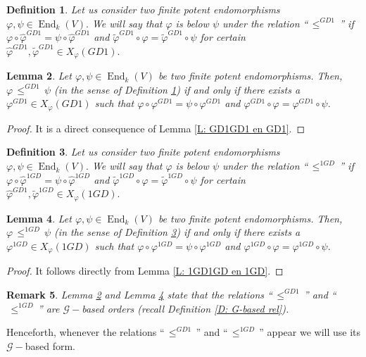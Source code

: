 \documentclass[10pt,a4paper]{amsart}
\newtheorem{defn}{Definition}
\newtheorem{lem}[defn]{Lemma}
\theoremstyle{plain}
\newtheorem{rem}[defn]{Remark}
\theoremstyle{remark}
\numberwithin{equation}{section} \numberwithin{defn}{section}
\newcommand\ed{\operatorname{End}}
\newcommand{\f}{\varphi}
\newcommand{\g}{\psi}
\begin{document}
\begin{defn}\label{D: Def GD1 order}
Let us consider two finite potent endomorphisms $\f, \g \in \ed_k(V).$ We will say that $\f$ is below $\g$ under the relation ``$\, \leq^{GD1} \,$'' if $\f \circ \hat{\f}^{GD1}=\g \circ \hat{\f}^{GD1}$ and $\tilde{\f}^{GD1}\circ \f=\tilde{\f}^{GD1}\circ \g$ for certain $\hat{\f}^{GD1},\tilde{\f}^{GD1}\in X_{\f}(GD1).$ 
\end{defn}

\begin{lem}\label{L: GD1 is G-Based}
Let $\f,\g \in \ed_k(V)$ be two finite potent endomorphisms. Then, $\f \, \leq^{GD1} \, \g$ (in the sense of Definition \ref{D: Def GD1 order}) if and only if there exists a $\f^{GD1}\in X_{\f}(GD1)$ such that $\f\circ \f^{GD1}=\g\circ \f^{GD1}$ and $\f^{GD1}\circ \f=\f^{GD1}\circ \g .$
\end{lem}
\begin{proof}
It is a direct consequence of Lemma \ref{L: GD1GD1 en GD1}.
\end{proof}


\begin{defn}\label{D: Def 1GD order}
Let us consider two finite potent endomorphisms $\f, \g \in \ed_k(V).$ We will say that $\f$ is below $\g$ under the relation ``$\, \leq^{1GD} \,$'' if $\f \circ \hat{\f}^{1GD}=\g \circ \hat{\f}^{1GD}$ and $\tilde{\f}^{1GD}\circ \f=\tilde{\f}^{1GD}\circ \g$ for certain $\hat{\f}^{GD1},\tilde{\f}^{1GD}\in X_{\f}(1GD).$ 
\end{defn}

\begin{lem}\label{L: 1GD is G-Based}
Let $\f,\g \in \ed_k(V)$ be two finite potent endomorphisms. Then, $\f \, \leq^{1GD} \, \g$ (in the sense of Definition \ref{D: Def 1GD order}) if and only if there exists a $\f^{1GD}\in X_{\f}(1GD)$ such that $\f\circ \f^{1GD}=\g\circ \f^{1GD}$ and $\f^{1GD}\circ \f=\f^{1GD}\circ \g .$
\end{lem}
\begin{proof}
It follows directly from Lemma \ref{L: 1GD1GD en 1GD}.
\end{proof}

\begin{rem}
Lemma \ref{L: GD1 is G-Based} and Lemma \ref{L: 1GD is G-Based} state that the relations ``$\, \leq^{GD1} \,$'' and ``$\, \leq^{1GD} \,$'' are $\mathcal{G}-$based orders (recall Definition \ref{D: G-based rel}).
\end{rem}

Henceforth, whenever the relations ``$\, \leq^{GD1} \,$'' and ``$\, \leq^{1GD} \,$'' appear we will use its $\mathcal{G}-$based form.
\end{document}
